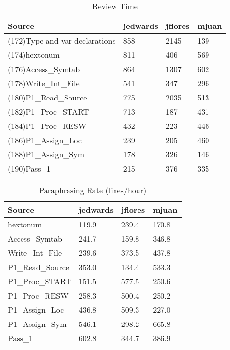 \begin{table}[hb]
\begin{center}
\begin{tabular}{|l|l|l|l|}
\hline
Source & jedwards & jflores & mjuan\\
\hline
(172)Type and var declarations & 858 & 2145 & 139\\
(174)hextonum & 811 & 406 & 569\\
(176)Access\_Symtab & 864 & 1307 & 602\\
(178)Write\_Int\_File & 541 & 347 & 296\\
(180)P1\_Read\_Source & 775 & 2035 & 513\\
(182)P1\_Proc\_START & 713 & 187 & 431\\
(184)P1\_Proc\_RESW & 432 & 223 & 446\\
(186)P1\_Assign\_Loc & 239 & 205 & 460\\
(188)P1\_Assign\_Sym & 178 & 326 & 146\\
(190)Pass\_1 & 215 & 376 & 335\\
\hline
\end{tabular}
\end{center}
\caption{Review Time}
\end{table}

\begin{table}[hb]
\begin{center}
\begin{tabular}{|l|l|l|l|}
\hline
Source & jedwards & jflores & mjuan\\
\hline
hextonum & 119.9 & 239.4 & 170.8\\
Access\_Symtab & 241.7 & 159.8 & 346.8\\
Write\_Int\_File & 239.6 & 373.5 & 437.8\\
P1\_Read\_Source & 353.0 & 134.4 & 533.3\\
P1\_Proc\_START & 151.5 & 577.5 & 250.6\\
P1\_Proc\_RESW & 258.3 & 500.4 & 250.2\\
P1\_Assign\_Loc & 436.8 & 509.3 & 227.0\\
P1\_Assign\_Sym & 546.1 & 298.2 & 665.8\\
Pass\_1 & 602.8 & 344.7 & 386.9\\
\hline
\end{tabular}
\end{center}
\caption{Paraphrasing Rate (lines/hour)}
\end{table}

